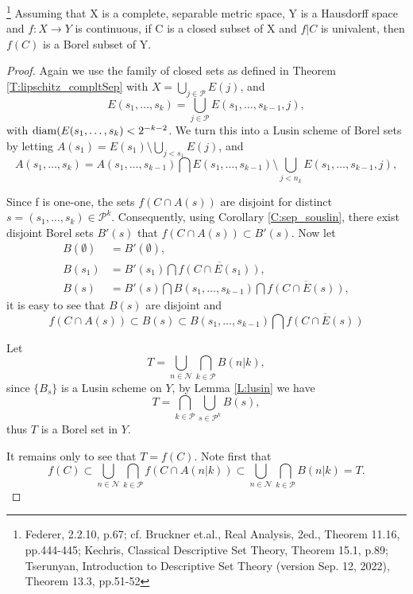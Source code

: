 \begin{lemma}
\footnote{Federer, 2.2.10, p.67;
  cf. Bruckner et.al., Real Analysis, 2ed., Theorem 11.16, pp.444-445; 
  Kechris, Classical Descriptive Set Theory, Theorem 15.1, p.89;
  Tserunyan, Introduction to Descriptive Set Theory (version Sep. 12, 2022), 
  Theorem 13.3, pp.51-52}
Assuming that X is a complete, separable metric space, Y is a Hausdorff space
and $f:X\to Y$ is continuous, if C is a closed subset of X and $f|C$ is 
univalent, then $f(C)$ is a Borel subset of Y.
\end{lemma}
\begin{proof}
Again we use the family of closed sets as defined in 
Theorem \ref{T:lipschitz_compltSep} with 
$X=\bigcup_{j\in\mathcal{P}} E(j)$, and
\[
	E(s_1,\dots,s_k)=\bigcup_{j\in\mathcal{P}} E(s_1,\dots,s_{k-1},j),
\]
with $\operatorname*{diam}(E(s_1,\dots,s_k)<2^{-k-2}$.
We turn this into a Lusin scheme of Borel sets by letting 
$A(s_1)=E(s_1)\setminus \bigcup_{j<s_1} E(j)$, and
\[
	A(s_1,\dots,s_k) = A(s_1,\dots,s_{k-1}) \bigcap E(s_1,\dots,s_{k-1})
	  \setminus \bigcup_{j<n_k} E(s_1,\dots,s_{k-1},j),
\]

Since f is one-one, the sets $f(C\cap A(s))$ are disjoint for distinct 
$s=(s_1,\dots,s_k)\in\mathcal{P}^k$. Consequently, using Corollary
\ref{C:sep_souslin}, there exist disjoint Borel sets $B'(s)$ that
$f(C\cap A(s))\subset B'(s)$. Now let
\begin{align*}
  B(\emptyset) &= B'(\emptyset), \\
  B(s_1) &= B'(s_1) \bigcap \overline{f(C\cap E(s_1))}, \\
  B(s) &= B'(s) \bigcap B(s_1,\dots,s_{k-1}) \bigcap \overline{f(C\cap E(s))},
\end{align*}
it is easy to see that $B(s)$ are disjoint and 
\[
  f(C\cap A(s))\subset B(s) \subset B(s_1,\dots,s_{k-1}) 
    \bigcap \overline{f(C\cap E(s))}
\]

Let 
\[
	T=\bigcup_{n\in\mathcal{N}} \bigcap_{k\in\mathcal{P}} B(n|k),
\]
since $\{B_s\}$ is a Lusin scheme on $Y$, by Lemma \ref{L:lusin} we have
\[
	T= \bigcap_{k\in\mathcal{P}} \bigcup_{s\in\mathcal{P}^k} B(s),
\]
thus $T$ is a Borel set in $Y$.

It remains only to see that $T=f(C)$. Note first that 
\[
  f(C)\subset 
    \bigcup_{n\in\mathcal{N}} \bigcap_{k\in\mathcal{P}} f(C\cap A(n|k)) 
	\subset \bigcup_{n\in\mathcal{N}} \bigcap_{k\in\mathcal{P}} B(n|k)
	= T.
\]


\end{proof}






